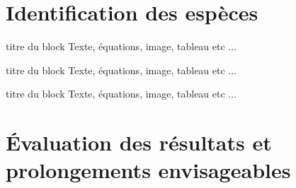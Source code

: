 \documentclass{beamer}
\begin{document}
\section{Identification des espèces}
\begin{frame}
	\begin{block}{ titre du block }
		Texte, équations, image, tableau etc ...
  	\end{block}
  
  	\begin{alertblock}{ titre du block }
		Texte, équations, image, tableau etc ...
  	\end{alertblock}

 	\begin{exampleblock}{ titre du block }
		Texte, équations, image, tableau etc ...
	\end{exampleblock}
\end{frame}

\section{\'{E}valuation des résultats et prolongements envisageables}
\begin{frame}

\end{frame}

\begin{frame}

\end{frame}

\begin{frame}

\end{frame}
\end{document}

